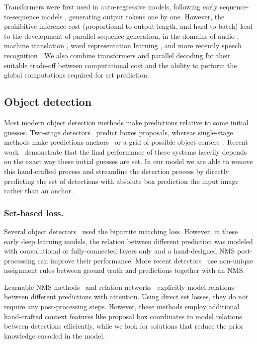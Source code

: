 Transformers were first used in auto-regressive models, following early sequence-to-sequence models \cite{sutskever2014sequence}, generating output tokens one by one. However, the prohibitive inference cost (proportional to output length, and hard to batch) lead to the development of parallel sequence generation, in the domains of audio \cite{oord2017parallel}, machine translation \cite{Gu2017NonAutoregressiveNM,ghazvininejad2019constant}, word representation learning \cite{Devlin2019BERTPO}, and more recently speech recognition \cite{chan2020imputer}. We also combine transformers and parallel decoding for their suitable trade-off between computational cost and the ability to perform the global computations required for set prediction.



\subsection{Object detection}

Most modern object detection methods make predictions relative to some initial guesses. Two-stage detectors~\cite{Ren2015FasterRT,Cai2019CascadeRH} predict boxes \wrt proposals, whereas single-stage methods make predictions \wrt anchors~\cite{Lin2017FocalLF} or a grid of possible object centers~\cite{Zhou2019objects,tian2019fcos}. Recent work~\cite{Zhang2019bridging} demonstrate that the final performance of these systems heavily depends on the exact way these initial guesses are set. In our model we are able to remove this hand-crafted process and streamline the detection process by directly predicting the set of detections with absolute box prediction \wrt the input image rather than an anchor.

\subsubsection{Set-based loss.} 
Several object detectors~\cite{erhan2014scalable,Liu2016SSDSS,redmon2016you} used the bipartite matching loss. However, in these early deep learning models, the relation between different prediction was modeled with convolutional or fully-connected layers only and a hand-designed NMS post-processing can improve their performance. More recent detectors~\cite{Ren2015FasterRT,Lin2017FocalLF,Zhou2019objects} use non-unique assignment rules between ground truth and predictions together with an NMS.


Learnable NMS methods~\cite{Hosang2017LearningNS,Bodla2017SoftNMSI} and relation networks~\cite{Hu2017RelationNF} explicitly model relations between different predictions with attention. Using direct set losses, they do not require any post-processing steps. However, these methods employ additional hand-crafted context features like proposal box coordinates to model relations between detections efficiently, while we look for solutions that reduce the prior knowledge encoded in the model.

